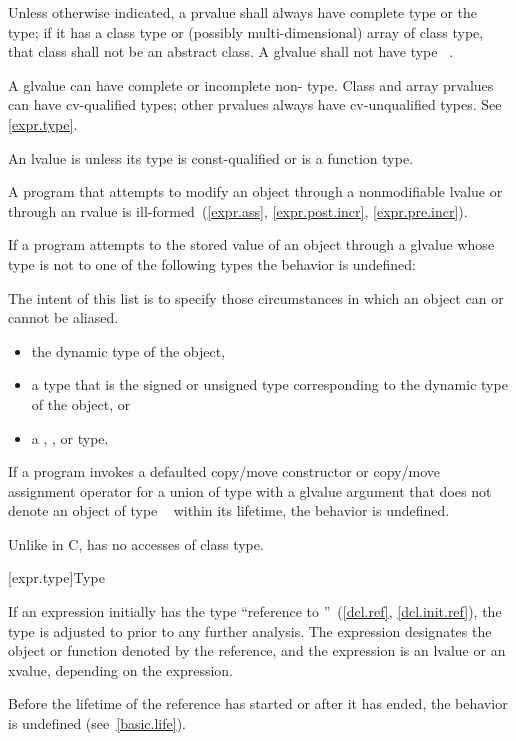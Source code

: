 \pnum
Unless otherwise indicated,
a prvalue shall always have complete type or the  type;
if it has a class type or (possibly multi-dimensional) array of class type,
that class shall not be an abstract class.
A glvalue shall not have type \cv{}~.
\begin{note}
A glvalue can have complete or incomplete non- type.
Class and array prvalues can have cv-qualified types; other prvalues
always have cv-unqualified types. See \ref{expr.type}.
\end{note}

\pnum
An lvalue is  unless its type is const-qualified
or is a function type.
\begin{note}
A program that attempts
to modify an object through a nonmodifiable lvalue or through an rvalue
is ill-formed~(\ref{expr.ass}, \ref{expr.post.incr}, \ref{expr.pre.incr}).
\end{note}

\pnum
If a program attempts to 
the stored value of an object through a glvalue
whose type is not  to
one of the following types the behavior is
undefined:
\begin{footnote}
The intent of this list is to specify those circumstances in which an
object can or cannot be aliased.
\end{footnote}
\begin{itemize}
\item the dynamic type of the object,

\item a type that is the signed or unsigned type corresponding to the
dynamic type of the object, or

\item a , , or  type.
\end{itemize}
If a program invokes
a defaulted copy/move constructor or copy/move assignment operator
for a union of type  with a glvalue argument
that does not denote an object of type \cv{}~ within its lifetime,
the behavior is undefined.
\begin{note}
Unlike in C, \Cpp{} has no accesses of class type.
\end{note}

[expr.type]{Type}

\pnum
{}%
If an expression initially has the type ``reference to
''~(\ref{dcl.ref}, \ref{dcl.init.ref}), the type is adjusted to
 prior to any further analysis. The expression designates the
object or function denoted by the reference, and the expression
is an lvalue or an xvalue, depending on the expression.
\begin{note}
Before the lifetime of the reference has started or after it has ended,
the behavior is undefined (see~\ref{basic.life}).
\end{note}


